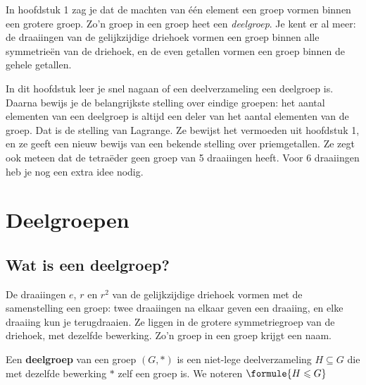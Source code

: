 In hoofdstuk 1 zag je dat de machten van één element een groep vormen binnen een grotere groep. Zo'n groep in een groep heet een \textit{deelgroep}. Je kent er al meer: de draaiingen van de gelijkzijdige driehoek vormen een groep binnen alle symmetrieën van de driehoek, en de even getallen vormen een groep binnen de gehele getallen.

In dit hoofdstuk leer je snel nagaan of een deelverzameling een deelgroep is. Daarna bewijs je de belangrijkste stelling over eindige groepen: het aantal elementen van een deelgroep is altijd een deler van het aantal elementen van de groep. Dat is de stelling van Lagrange. Ze bewijst het vermoeden uit hoofdstuk 1, en ze geeft een nieuw bewijs van een bekende stelling over priemgetallen. Ze zegt ook meteen dat de tetraëder geen groep van 5 draaiingen heeft. Voor 6 draaiingen heb je nog een extra idee nodig.

\begin{oefeningen}[Start]

\end{oefeningen}


\section{Deelgroepen}

\subsection{Wat is een deelgroep?}

De draaiingen $e$, $r$ en $r^2$ van de gelijkzijdige driehoek vormen met de samenstelling een groep: twee draaiingen na elkaar geven een draaiing, en elke draaiing kun je terugdraaien. Ze liggen in de grotere symmetriegroep van de driehoek, met dezelfde bewerking. Zo'n groep in een groep krijgt een naam.

\begin{theorie}
Een \textbf{\textcolor{accent}{deelgroep}} van een groep $(G, \ast)$ is een niet-lege deelverzameling $H \subseteq G$ die met dezelfde bewerking $\ast$ zelf een groep is. We noteren \quad $\formule{H \leqslant G}$
\end{theorie}

